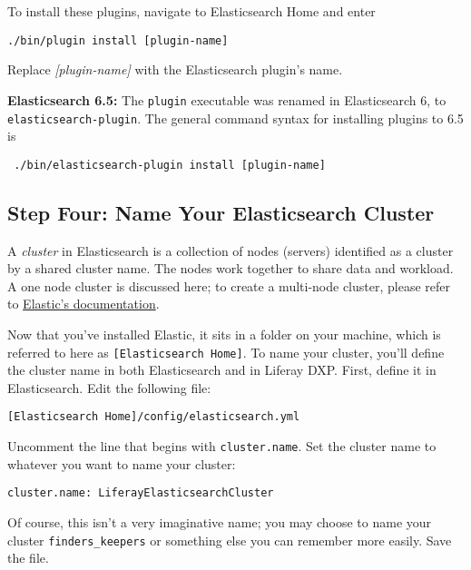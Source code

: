 To install these plugins, navigate to Elasticsearch Home and enter

\begin{verbatim}
./bin/plugin install [plugin-name]
\end{verbatim}

Replace \emph{{[}plugin-name{]}} with the Elasticsearch plugin's name.

\noindent\hrulefill

\textbf{Elasticsearch 6.5:} The \texttt{plugin} executable was renamed
in Elasticsearch 6, to \texttt{elasticsearch-plugin}. The general
command syntax for installing plugins to 6.5 is

\begin{verbatim}
 ./bin/elasticsearch-plugin install [plugin-name]
\end{verbatim}

\noindent\hrulefill

\subsection{Step Four: Name Your Elasticsearch
Cluster}\label{step-four-name-your-elasticsearch-cluster}

A \emph{cluster} in Elasticsearch is a collection of nodes (servers)
identified as a cluster by a shared cluster name. The nodes work
together to share data and workload. A one node cluster is discussed
here; to create a multi-node cluster, please refer to
\href{https://www.elastic.co/guide/index.html}{Elastic's documentation}.

Now that you've installed Elastic, it sits in a folder on your machine,
which is referred to here as \texttt{{[}Elasticsearch\ Home{]}}. To name
your cluster, you'll define the cluster name in both Elasticsearch and
in Liferay DXP. First, define it in Elasticsearch. Edit the following
file:

\begin{verbatim}
[Elasticsearch Home]/config/elasticsearch.yml
\end{verbatim}

Uncomment the line that begins with \texttt{cluster.name}. Set the
cluster name to whatever you want to name your cluster:

\begin{verbatim}
cluster.name: LiferayElasticsearchCluster
\end{verbatim}

Of course, this isn't a very imaginative name; you may choose to name
your cluster \texttt{finders\_keepers} or something else you can
remember more easily. Save the file.

